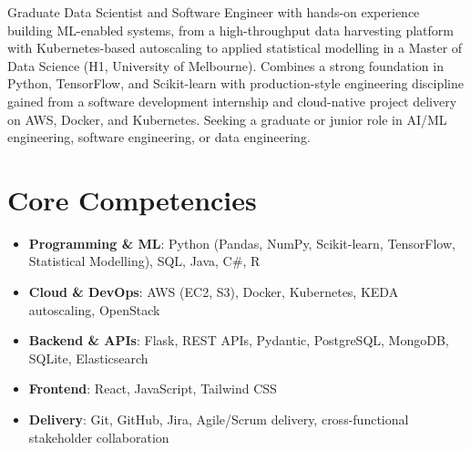 \documentclass[11pt,a4paper,sans]{moderncv}
\begin{document}
\makecvtitle


\vspace{6pt}
\small{Graduate Data Scientist and Software Engineer with hands-on experience building ML-enabled systems, from a high-throughput data harvesting platform with Kubernetes-based autoscaling to applied statistical modelling in a Master of Data Science (H1, University of Melbourne). Combines a strong foundation in Python, TensorFlow, and Scikit-learn with production-style engineering discipline gained from a software development internship and cloud-native project delivery on AWS, Docker, and Kubernetes. Seeking a graduate or junior role in AI/ML engineering, software engineering, or data engineering.}


\section{Core Competencies}
\vspace{1pt}
\begin{itemize}

\item \textbf{Programming \& ML}: Python (Pandas, NumPy, Scikit-learn, TensorFlow, Statistical Modelling), SQL, Java, C\#, R

\item \textbf{Cloud \& DevOps}: AWS (EC2, S3), Docker, Kubernetes, KEDA autoscaling, OpenStack

\item \textbf{Backend \& APIs}: Flask, REST APIs, Pydantic, PostgreSQL, MongoDB, SQLite, Elasticsearch

\item \textbf{Frontend}: React, JavaScript, Tailwind CSS

\item \textbf{Delivery}: Git, GitHub, Jira, Agile/Scrum delivery, cross-functional stakeholder collaboration

\end{itemize}

\end{document}
